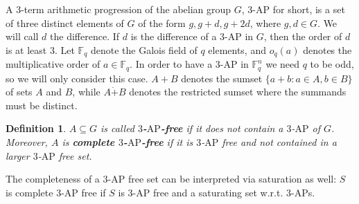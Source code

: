 \documentclass[11pt]{article}
\numberwithin{table}{section}
\newcommand{\F}{{\mathbb F}}
\newtheorem{definition}[theorem]{Definition}
\theoremstyle{definition}
\begin{document}
	
	
	
	
	
	
	
	A $3$-term arithmetic progression of the abelian group $G$, $3$-$\mathrm{AP}$ for short,  is a set of three distinct elements of $G$ of the form $g,g+d,g+2d$, where $g,d\in G$. We will call $d$ the difference. If $d$ is the difference of a $3$-$\mathrm{AP}$ in $G$, then the order of $d$ is at least $3$. Let $\F_q$ denote the Galois field of $q$ elements, and $o_q(a)$ denotes the multiplicative order of $a \in\F_q$. In order to have a $3$-$\mathrm{AP}$ in $\F_q^n$ we need $q$ to be odd, so we will only consider this case. $A+B$ denotes the sumset $\{a+b :  a\in A, b\in B\}$ of sets $A$ and $B$,  while $A\dot+B$ denotes the restricted sumset where the summands must be distinct.
	
	
	\begin{definition}
		$A\subseteq G$ is called \textbf{$3$-$\mathrm{AP}$-free} if it does not contain a $3$-$\mathrm{AP}$ of $G$.
		Moreover, $A$ is \textbf{complete $3$-$\mathrm{AP}$-free} if it is $3$-$\mathrm{AP}$ free and  not contained in a larger $3$-$\mathrm{AP}$ free set. 
	\end{definition}
	\vspace{-0.2cm}
	The completeness of a $3$-$\mathrm{AP}$ free set can be interpreted via saturation as well: $S$ is complete $3$-$\mathrm{AP}$ free if $S$ is $3$-$\mathrm{AP}$ free and a saturating set w.r.t. $3$-$\mathrm{AP}$s.
	
\end{document}
